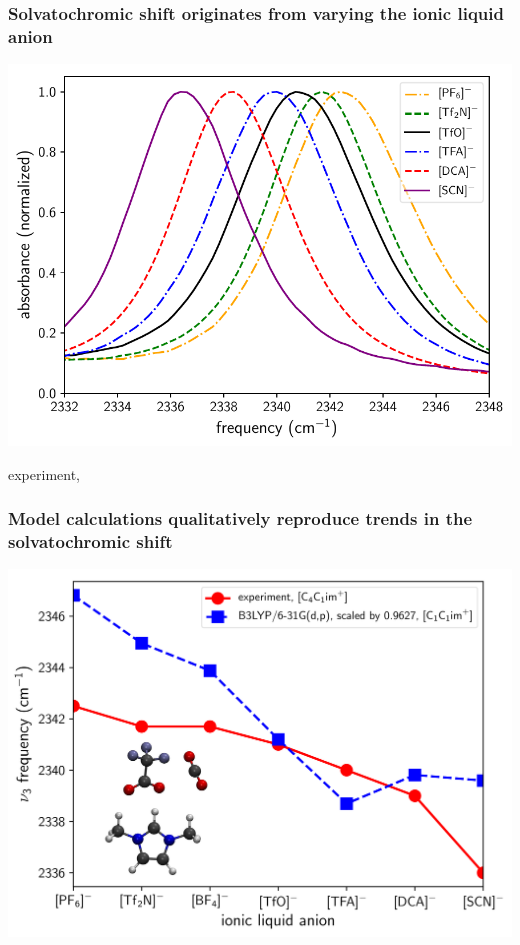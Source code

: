 \documentclass[%
    xcolor=usenames,dvipsnames,svgnames%
]{beamer}
\newenvironment{nscenter}
 {\parskip=0pt\par\nopagebreak\centering}
 {\par\noindent\ignorespacesafterend}
\begin{document}
\begin{frame}
  \frametitle{Solvatochromic shift originates from varying the ionic liquid anion}
  \begin{nscenter}
    \includegraphics[scale=0.65]{./figures/experimental_spectra_shifting.pdf}
  \end{nscenter}
  \scriptsize
  experiment, \ce{[C4C1im]+}
\end{frame}

\begin{frame}
  \frametitle{Model calculations qualitatively reproduce trends in the solvatochromic shift}
  \begin{nscenter}
    \includegraphics[width=\linewidth,keepaspectratio]{./figures/frequencies_calc_vs_expt1_combined2.pdf}
  \end{nscenter}
\end{frame}
\end{document}
